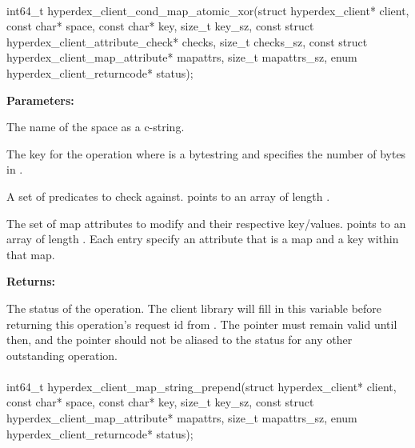\paragraph{}
\label{api:c:cond_map_atomic_xor}
\begin{ccode}
int64_t hyperdex_client_cond_map_atomic_xor(struct hyperdex_client* client,
        const char* space,
        const char* key, size_t key_sz,
        const struct hyperdex_client_attribute_check* checks, size_t checks_sz,
        const struct hyperdex_client_map_attribute* mapattrs, size_t mapattrs_sz,
        enum hyperdex_client_returncode* status);
\end{ccode}
\funcdesc 

\noindent\textbf{Parameters:}
\begin{description}[labelindent=\widthof{{\code{mapattrs}, \code{mapattrs\_sz}}},leftmargin=*,noitemsep,nolistsep,align=right]
\item[\code{space}] The name of the space as a c-string.
\item[\code{key}, \code{key\_sz}] The key for the operation where  is a bytestring and  specifies the number of bytes in .
\item[\code{checks}, \code{checks\_sz}] A set of predicates to check against.   points to an array of length .
\item[\code{mapattrs}, \code{mapattrs\_sz}] The set of map attributes to modify and their respective key/values.   points to an array of length .  Each entry specify an attribute that is a map and a key within that map.
\end{description}

\noindent\textbf{Returns:}
\begin{description}[labelindent=\widthof{{\code{status}}},leftmargin=*,noitemsep,nolistsep,align=right]
\item[\code{status}] The status of the operation.  The client library will fill in this variable before returning this operation's request id from .  The pointer must remain valid until then, and the pointer should not be aliased to the status for any other outstanding operation.
\end{description}

\paragraph{}
\label{api:c:map_string_prepend}
\begin{ccode}
int64_t hyperdex_client_map_string_prepend(struct hyperdex_client* client,
        const char* space,
        const char* key, size_t key_sz,
        const struct hyperdex_client_map_attribute* mapattrs, size_t mapattrs_sz,
        enum hyperdex_client_returncode* status);
\end{ccode}
\funcdesc 

